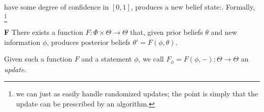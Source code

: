 \documentclass{uai2023} %
\begin{document}
have some degree of confidence in $[0,1]$, produces a new belief
state:.  Formally,
\unskip\footnote{we can just as easily handle randomized updates;
	the point is simply that the update can be prescribed by an algorithm.}
\begin{CFaxioms}
\item[\textbf{F}]
		There exists a function $F : \Phi \times \Theta \to \Theta$ that,
		given prior beliefs $\theta$ and new information $\phi$, produces
		posterior beliefs $\theta' = F(\phi, \theta)$.
\end{CFaxioms}

Given such a function $F$ and a statement $\phi$, we call $F_\phi = F(\phi, -) : \Theta \to \Theta$ an \emph{update}.
\end{document}
